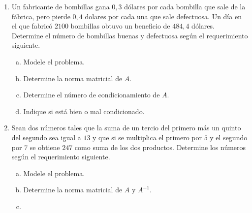 \documentclass[
	spanish,
	9pt,
	utf8,
	xcolor=table,
	handout,
	aspectratio=1610,
	professionalfonts,
	notheorems,
	mathserif,
]{beamer}
\newcounter{savedenum}
\newcommand*{\resume}{\setcounter{enumi}{\thesavedenum}}
\begin{document}
\begin{frame}
	\begin{enumerate}
		\resume

		\item
		      Un fabricante de bombillas gana $0,3$ dólares por cada bombilla que sale de la fábrica, pero pierde
		      $0,4$ dolares por cada una que sale defectuosa.
		      Un día en el que fabricó $2100$ bombillas obtuvo
		      un beneficio de $484,4$ dólares.
		      Determine el número de bombillas buenas y defectuosa según el requerimiento siguiente.

		      \begin{multicols}{2}
			      \begin{enumerate}[a)]
				      \item

				            Modele el problema.

				      \item

				            Determine la norma matricial de $A$.

				      \item

				            Determine el número de condicionamiento de $A$.

				      \item

				            Indique si está bien o mal condicionado.
			      \end{enumerate}
		      \end{multicols}

		\item
		      Sean dos números tales que la suma de un tercio del primero más un quinto del segundo sea igual
		      a $13$ y que si se multiplica el primero por $5$ y el segundo por $7$ se obtiene $247$ como suma de los dos productos.
		      Determine los números según el requerimiento siguiente.

		      \begin{multicols}{2}
			      \begin{enumerate}[a)]
				      \item

				            Modele el problema.

				      \item

				            Determine la norma matricial de $A$ y $A^{-1}$.

				      \item


\end{enumerate}
\end{multicols}
\end{enumerate}
\end{frame}
\end{document}
